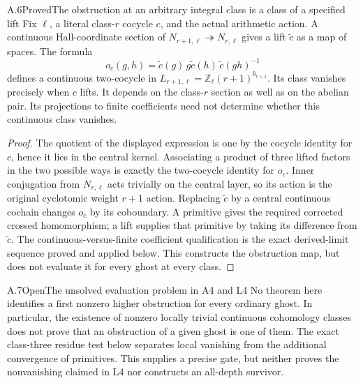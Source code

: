 \begin{result}{A.6}{Proved}{The obstruction at an arbitrary integral class is a class of a specified lift}
Fix \(\ell\), a literal class-\(r\) cocycle \(c\), and the actual
arithmetic action. A continuous Hall-coordinate section of
\(N_{r+1,\ell}\twoheadrightarrow N_{r,\ell}\) gives a lift
\(\widetilde c\) as a map of spaces. The formula
\[
 o_c(g,h)=\widetilde c(g)\,g\widetilde c(h)\,
                 \widetilde c(gh)^{-1}
\]
defines a continuous two-cocycle in
\(L_{r+1,\ell}=\mathbb Z_\ell(r+1)^{b_{r+1}}\).
Its class vanishes precisely when \(c\) lifts. It depends on the
class-\(r\) section as well as on the abelian pair. Its projections to
finite coefficients need not determine whether this continuous class
vanishes.
\end{result}
\begin{proof}
The quotient of the displayed expression is one by the cocycle identity
for \(c\), hence it lies in the central kernel. Associating a product
of three lifted factors in the two possible ways is exactly the
two-cocycle identity for \(o_c\). Inner conjugation from
\(N_{r,\ell}\) acts trivially on the central layer, so its action is
the original cyclotomic weight \(r+1\) action. Replacing
\(\widetilde c\) by a central continuous cochain changes \(o_c\)
by its coboundary. A primitive gives the required corrected crossed
homomorphism; a lift supplies that primitive by taking its difference
from \(\widetilde c\). The continuous-versus-finite coefficient
qualification is the exact derived-limit sequence proved and applied
below. This constructs the obstruction map, but does not evaluate it
for every ghost at every class.
\end{proof}

\begin{result}{A.7}{Open}{The unsolved evaluation problem in A4 and L4}
No theorem here identifies a first nonzero higher obstruction for every
ordinary ghost. In particular, the existence of nonzero locally trivial
continuous cohomology classes does not prove that an obstruction of a
given ghost is one of them. The exact class-three residue test below
separates local vanishing from the additional convergence of primitives.
This supplies a precise gate, but neither proves the nonvanishing
claimed in L4 nor constructs an all-depth survivor.
\end{result}

